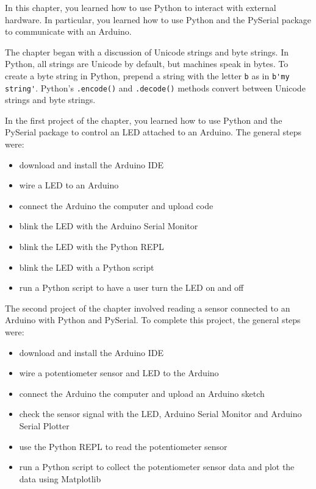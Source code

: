 \documentclass{book}
\providecommand{\tightlist}{%
      \setlength{\itemsep}{0pt}\setlength{\parskip}{0pt}}
\begin{document}
    
        In this chapter, you learned how to use Python to interact with external
hardware. In particular, you learned how to use Python and the PySerial
package to communicate with an Arduino.

The chapter began with a discussion of Unicode strings and byte strings.
In Python, all strings are Unicode by default, but machines speak in
bytes. To create a byte string in Python, prepend a string with the
letter \lstinline!b! as in \lstinline!b'my string'!. Python's
\lstinline!.encode()! and \lstinline!.decode()! methods convert between
Unicode strings and byte strings.

In the first project of the chapter, you learned how to use Python and
the PySerial package to control an LED attached to an Arduino. The
general steps were:

\begin{itemize}
\tightlist
\item
  download and install the Arduino IDE
\item
  wire a LED to an Arduino
\item
  connect the Arduino the computer and upload code
\item
  blink the LED with the Arduino Serial Monitor
\item
  blink the LED with the Python REPL
\item
  blink the LED with a Python script
\item
  run a Python script to have a user turn the LED on and off
\end{itemize}

The second project of the chapter involved reading a sensor connected to
an Arduino with Python and PySerial. To complete this project, the
general steps were:

\begin{itemize}
\tightlist
\item
  download and install the Arduino IDE
\item
  wire a potentiometer sensor and LED to the Arduino
\item
  connect the Arduino the computer and upload an Arduino sketch
\item
  check the sensor signal with the LED, Arduino Serial Monitor and
  Arduino Serial Plotter
\item
  use the Python REPL to read the potentiometer sensor
\item
  run a Python script to collect the potentiometer sensor data and plot
  the data using Matplotlib
\end{itemize}
    
\end{document}
